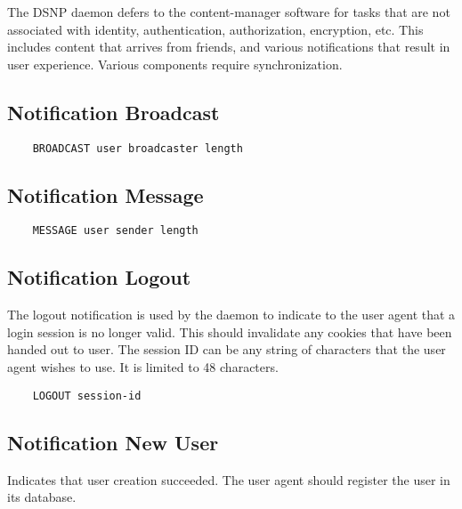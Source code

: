 \documentclass[letterpaper,11pt,oneside]{article}
\begin{document}
The DSNP daemon defers to the content-manager software for tasks that are not
associated with identity, authentication, authorization, encryption, etc. This
includes content that arrives from friends, and various notifications that
result in user experience. Various components require synchronization.

\subsection{Notification Broadcast}

\vspace{10pt}
\begin{verbatim}
    BROADCAST user broadcaster length 
\end{verbatim}
\vspace{10pt}

\subsection{Notification Message}

\vspace{10pt}
\begin{verbatim}
    MESSAGE user sender length 
\end{verbatim}
\vspace{10pt}

\subsection{Notification Logout}

The logout notification is used by the daemon to indicate to the user agent
that a login session is no longer valid. This should invalidate any cookies
that have been handed out to user. The session ID can be any string of
characters that the user agent wishes to use. It is limited to 48 characters.

\vspace{10pt}
\begin{verbatim}
    LOGOUT session-id
\end{verbatim}
\vspace{10pt}

\subsection{Notification New User}

Indicates that user creation succeeded. The user agent should register the user
in its database.
\end{document}
